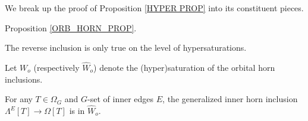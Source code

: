\documentclass[a4paper,10pt,draft]{article}%
\begin{document}
We break up the proof of Proposition \ref{HYPER PROP} into its constituent pieces.

\begin{proposition}
      Proposition \ref{ORB_HORN_PROP}.
\end{proposition}

The reverse inclusion is only true on the level of hypersaturations.

\begin{definition}
      Let $W_o$ (respectively $\hat{W}_o$) denote the (hyper)saturation of the orbital horn inclusions.
\end{definition}

\begin{proposition}
      \label{HORN_ORB_PROP}
      For any $T \in \Omega_G$ and $G$-set of inner edges $E$,
      the generalized inner horn inclusion
      $\Lambda^{E}[T] \to \Omega[T]$
      is in $\hat{W}_o$.
\end{proposition}
\end{document}
